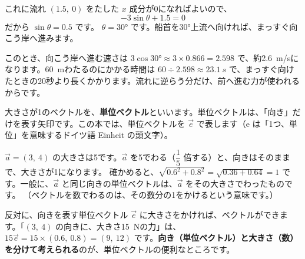 \noindent\begin{minipage}[c]{0.38\linewidth}\centering
{}
\end{minipage}\hfill
\begin{minipage}[c]{0.58\linewidth}\raggedright 
これに流れ $(1.5,\ 0)$ をたした $x$ 成分が0になればよいので、
\[ -3\sin\theta+1.5=0 \]
だから $\sin\theta=0.5$ です。
$\theta=30°$ です。船首を30°上流へ向ければ、まっすぐ向こう岸へ進みます。
\end{minipage}

\par\vspace{4pt}
このとき、向こう岸へ進む速さは $3\cos30°\approx3\times0.866=2.598$ で、約\qty{2.6}{m/s}になります。\qty{60}{m}わたるのにかかる時間は $60\div2.598\approx\qty{23.1}{s}$ で、まっすぐ向けたときの20秒より長くかかります。流れに逆らう分だけ、前へ進む力が使われるからです。


\label{bk:4-11:tani}大きさが1のベクトルを、\textbf{単位ベクトル}といいます。単位ベクトルは、「向き」だけを表す矢印です。この本では、単位ベクトルを $\vec{e}$ で表します（e は「1つ、単位」を意味するドイツ語 Einheit の頭文字）。

$\vec{a}=(3,\ 4)$ の大きさは5です。$\vec{a}$ を5でわる（$\dfrac{1}{5}$ 倍する）と、向きはそのままで、大きさが1になります。
確かめると、$\sqrt{0.6^2+0.8^2}=\sqrt{0.36+0.64}=1$ です。一般に、$\vec{a}$ と同じ向きの単位ベクトルは、$\vec{a}$ をその大きさでわったものです。
（ベクトルを数でわるのは、その数分の1をかけるという意味です。）

反対に、向きを表す単位ベクトル $\vec{e}$ に大きさをかければ、ベクトルができます。「$(3,\ 4)$ の向きに、大きさ\qty{15}{N}の力」は、$15\vec{e}=15\times(0.6,\ 0.8)=(9,\ 12)$ です。\textbf{向き（単位ベクトル）と大きさ（数）を分けて考えられる}のが、単位ベクトルの便利なところです。

